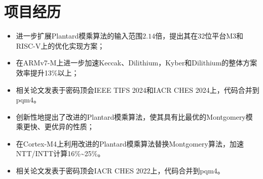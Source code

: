 \documentclass[UTF8,AutoFakeBold]{resume}
\begin{document}
\section{\hspace{0.25em}\makebox[0.75em][c]{\faGithub} \fangsong\textbf{项目经历}}
    \begin{itemize}
      \item \kaishu 进一步扩展Plantard模乘算法的输入范围$2.14$倍，提出其在32位平台M3和RISC-V上的优化实现方案；
      \item \kaishu 在ARMv7-M上进一步加速Keccak、Dilithium，Kyber和Dilithium的整体方案效率提升13\%以上；
      \item \kaishu 相关论文发表于密码顶会IEEE TIFS 2024和IACR CHES 2024上，代码合并到pqm4。
    \end{itemize}
    \begin{itemize}
      \item \kaishu 创新性地提出了改进的Plantard模乘算法，使其具有比最优的Montgomery模乘更快、更优异的性质；
      \item \kaishu 在Cortex-M4上利用改进的Plantard模乘算法替换Montgomery算法，加速NTT/INTT计算16\%\textasciitilde 25\%。
      \item \kaishu 相关论文发表于密码顶会IACR CHES 2022上，代码合并到pqm4。
    \end{itemize}

\vspace{2mm}
\end{document}
